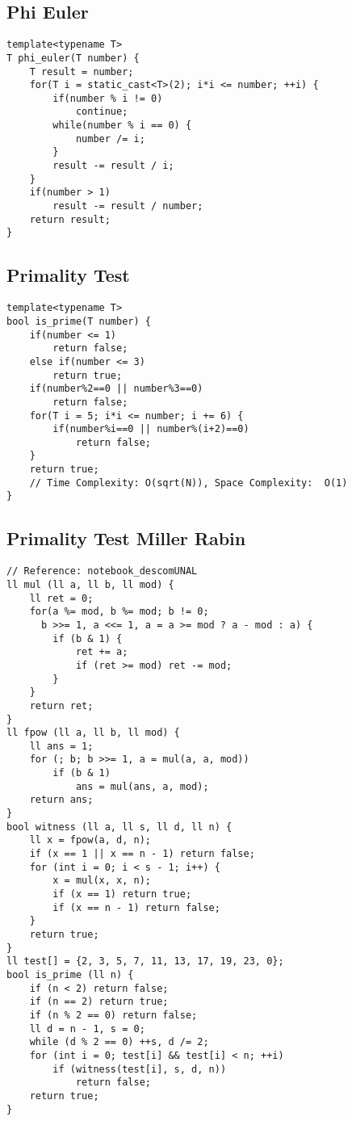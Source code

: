 \documentclass[10pt,letterpaper,twocolumn,twosided]{article}
\begin{document}
\subsection{Phi Euler}
\begin{lstlisting}
template<typename T>
T phi_euler(T number) {
    T result = number;
    for(T i = static_cast<T>(2); i*i <= number; ++i) {
        if(number % i != 0)
            continue;
        while(number % i == 0) {
            number /= i;
        }
        result -= result / i;
    }
    if(number > 1)
        result -= result / number;
    return result;
}
\end{lstlisting}

\subsection{Primality Test}
\begin{lstlisting}
template<typename T>
bool is_prime(T number) {
    if(number <= 1)
        return false;
    else if(number <= 3)
        return true;
    if(number%2==0 || number%3==0)
        return false;
    for(T i = 5; i*i <= number; i += 6) {
        if(number%i==0 || number%(i+2)==0)
            return false;
    }
    return true;
    // Time Complexity: O(sqrt(N)), Space Complexity:  O(1)
}
\end{lstlisting}

\subsection{Primality Test Miller Rabin}
\begin{lstlisting}
// Reference: notebook_descomUNAL
ll mul (ll a, ll b, ll mod) {
    ll ret = 0;
    for(a %= mod, b %= mod; b != 0;
      b >>= 1, a <<= 1, a = a >= mod ? a - mod : a) {
        if (b & 1) {
            ret += a;
            if (ret >= mod) ret -= mod;
        }
    }
    return ret;
}
ll fpow (ll a, ll b, ll mod) {
    ll ans = 1;
    for (; b; b >>= 1, a = mul(a, a, mod))
        if (b & 1)
            ans = mul(ans, a, mod);
    return ans;
}
bool witness (ll a, ll s, ll d, ll n) {
    ll x = fpow(a, d, n);
    if (x == 1 || x == n - 1) return false;
    for (int i = 0; i < s - 1; i++) {
        x = mul(x, x, n);
        if (x == 1) return true;
        if (x == n - 1) return false;
    }
    return true;
}
ll test[] = {2, 3, 5, 7, 11, 13, 17, 19, 23, 0};
bool is_prime (ll n) {
    if (n < 2) return false;
    if (n == 2) return true;
    if (n % 2 == 0) return false;
    ll d = n - 1, s = 0;
    while (d % 2 == 0) ++s, d /= 2;
    for (int i = 0; test[i] && test[i] < n; ++i)
        if (witness(test[i], s, d, n))
            return false;
    return true;
}
\end{lstlisting}
\end{document}
